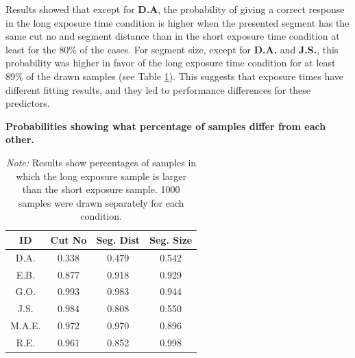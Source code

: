 \documentclass{article}
\begin{document}
Results showed that except for \textbf{D.A}, the probability of giving a correct response in the long exposure time condition is higher when the presented segment has the same cut no and segment distance than in the short exposure time condition at least for the $80\%$ of the cases. For segment size, except for \textbf{D.A.} and \textbf{J.S.}, this probability was higher in favor of the long exposure time condition for at least $89\%$ of the drawn samples (see Table \ref{table:sampleRes}). This suggests that exposure times have different fitting results, and they led to performance differences for these predictors.

\setlength{\tabcolsep}{3pt}
\begin{table}
    \centering
    \caption{\textbf{Probabilities showing what percentage of samples differ from each other.}}
    \label{table:sampleRes}
    \begin{tabular}{cccc}
    \hline
    ID &  Cut No &  Seg. Dist &  Seg. Size \\
    \hline
    D.A. &  0.338 &    0.479 &    0.542 \\
    E.B. &  0.877 &    0.918 &    0.929 \\
    G.O. &  0.993 &    0.983 &    0.944 \\
    J.S. &  0.984 &    0.808 &    0.550 \\
    M.A.E. &  0.972 &    0.970 &    0.896 \\
    R.E. &  0.961 &    0.852 &    0.998 \\
    \hline
    \end{tabular}
    \captionsetup{labelformat=empty}
    \caption*{\textit{Note:} Results show percentages of samples in which the long exposure sample is larger than the short exposure sample. 1000 samples were drawn separately for each condition.}
\end{table}
\end{document}
